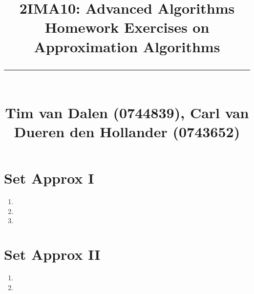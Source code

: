 \documentclass[a4paper,11pt]{article}
\title{
	\huge\raggedright 2IMA10: Advanced Algorithms \hfill\\{\Large Homework Exercises on Approximation Algorithms}\\ \vspace{-0.9\baselineskip}\rule{\linewidth}{1pt}\\
	\small\hfill Tim van Dalen (0744839), Carl van Dueren den Hollander (0743652)
	\normalsize
}
\begin{document}
	\maketitle

	\section*{Set Approx I}
		\begin{enumerate}
			\item 
			\item 
			\item 
		\end{enumerate}
	\section*{Set Approx II}
		\begin{enumerate}
			\item 
			\item 
		\end{enumerate}
\end{document}
